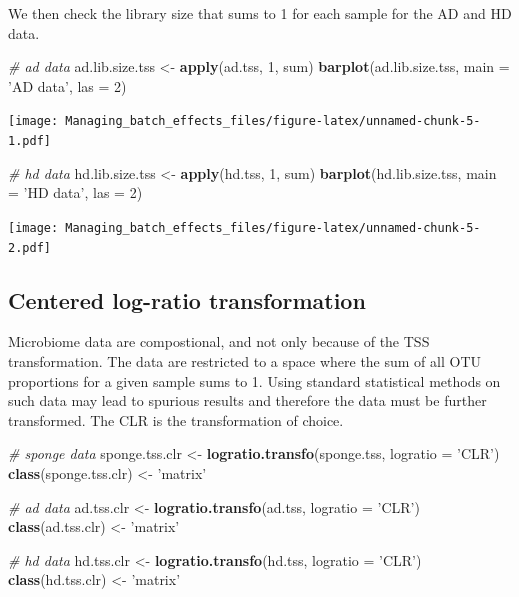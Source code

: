 \documentclass[]{book}
\newenvironment{Shaded}{\begin{snugshade}}{\end{snugshade}}
\newcommand{\KeywordTok}[1]{\textcolor[rgb]{0.13,0.29,0.53}{\textbf{#1}}}
\newcommand{\DataTypeTok}[1]{\textcolor[rgb]{0.13,0.29,0.53}{#1}}
\newcommand{\DecValTok}[1]{\textcolor[rgb]{0.00,0.00,0.81}{#1}}
\newcommand{\StringTok}[1]{\textcolor[rgb]{0.31,0.60,0.02}{#1}}
\newcommand{\CommentTok}[1]{\textcolor[rgb]{0.56,0.35,0.01}{\textit{#1}}}
\newcommand{\NormalTok}[1]{#1}
\begin{document}
We then check the library size that sums to 1 for each sample for the AD
and HD data.

\begin{Shaded}
\begin{Highlighting}[]
\CommentTok{# ad data}
\NormalTok{ad.lib.size.tss <-}\StringTok{ }\KeywordTok{apply}\NormalTok{(ad.tss, }\DecValTok{1}\NormalTok{, sum)}
\KeywordTok{barplot}\NormalTok{(ad.lib.size.tss, }\DataTypeTok{main =}  \StringTok{'AD data'}\NormalTok{, }\DataTypeTok{las =} \DecValTok{2}\NormalTok{)}
\end{Highlighting}
\end{Shaded}

\texttt{[image: Managing\_batch\_effects\_files/figure-latex/unnamed-chunk-5-1.pdf]}

\begin{Shaded}
\begin{Highlighting}[]
\CommentTok{# hd data}
\NormalTok{hd.lib.size.tss <-}\StringTok{ }\KeywordTok{apply}\NormalTok{(hd.tss, }\DecValTok{1}\NormalTok{, sum)}
\KeywordTok{barplot}\NormalTok{(hd.lib.size.tss, }\DataTypeTok{main =}  \StringTok{'HD data'}\NormalTok{, }\DataTypeTok{las =} \DecValTok{2}\NormalTok{)}
\end{Highlighting}
\end{Shaded}

\texttt{[image: Managing\_batch\_effects\_files/figure-latex/unnamed-chunk-5-2.pdf]}

\subsection{Centered log-ratio
transformation}\label{centered-log-ratio-transformation}

Microbiome data are compostional, and not only because of the TSS
transformation. The data are restricted to a space where the sum of all
OTU proportions for a given sample sums to 1. Using standard statistical
methods on such data may lead to spurious results and therefore the data
must be further transformed. The CLR is the transformation of choice.

\begin{Shaded}
\begin{Highlighting}[]
\CommentTok{# sponge data}
\NormalTok{sponge.tss.clr <-}\StringTok{ }\KeywordTok{logratio.transfo}\NormalTok{(sponge.tss, }\DataTypeTok{logratio =} \StringTok{'CLR'}\NormalTok{)}
\KeywordTok{class}\NormalTok{(sponge.tss.clr) <-}\StringTok{ 'matrix'} 

\CommentTok{# ad data}
\NormalTok{ad.tss.clr <-}\StringTok{ }\KeywordTok{logratio.transfo}\NormalTok{(ad.tss, }\DataTypeTok{logratio =} \StringTok{'CLR'}\NormalTok{)}
\KeywordTok{class}\NormalTok{(ad.tss.clr) <-}\StringTok{ 'matrix'} 

\CommentTok{# hd data}
\NormalTok{hd.tss.clr <-}\StringTok{ }\KeywordTok{logratio.transfo}\NormalTok{(hd.tss, }\DataTypeTok{logratio =} \StringTok{'CLR'}\NormalTok{)}
\KeywordTok{class}\NormalTok{(hd.tss.clr) <-}\StringTok{ 'matrix'}
\end{Highlighting}
\end{Shaded}
\end{document}
